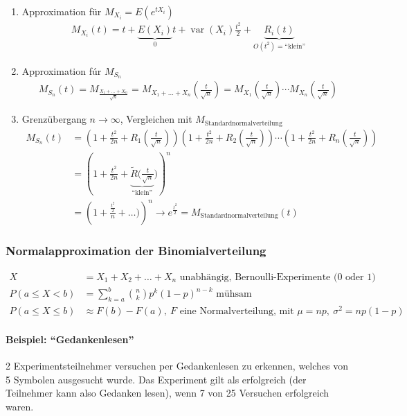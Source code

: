 \documentclass[10pt,a4paper]{scrartcl}
\newif\ifincludeExamples
\DeclareMathOperator{\var}{var}
\begin{document}
\begin{enumerate}
\item Approximation für $M_{X_i} = E(e^{tX_i})$
\begin{align*}
    M_{X_i}(t) = t + \underbrace{E(X_i)}_{0}t + \var(X_i)\frac{t^2}{2} + \underbrace{R_i(t)}_{O(t^2) = \text{``klein''}}
\end{align*}
\item Approximation fúr $M_{S_n}$
\begin{align*}
    M_{S_n}(t) = M_{\frac{X_1 + \dots + X_n}{\sqrt{n}}} = M_{X_1 + \dots + X_n} (\frac{t}{\sqrt{n}}) = M_{X_1}(\frac{t}{\sqrt{n}})\cdots M_{X_n}(\frac{t}{\sqrt{n}})
\end{align*}
\item Grenzübergang $n\to\infty$, Vergleichen mit $M_{\text{Standardnormalverteilung}}$
\begin{align*}
    M_{S_n}(t) &= \left( 1+\frac{t^2}{2n} + R_1(\frac{t}{\sqrt{n}})\right) \left( 1+\frac{t^2}{2n} + R_2(\frac{t}{\sqrt{n}})\right) \cdots 
        \left( 1+\frac{t^2}{2n} + R_n(\frac{t}{\sqrt{n}})\right) \\
        &= \left( 1+\frac{t^2}{2n} + \underbrace{\tilde{R}(\frac{t}{\sqrt{n}}}_{\text{``klein''}})\right)^n \\
        &= \left( 1+\frac{\frac{t^2}{2}}{n} + \dots)\right)^n \longrightarrow e^{\frac{t^2}{2}} = M_{\text{Standardnormalverteilung}}(t)
\end{align*}
\end{enumerate} 

\fi

\subsubsection{Normalapproximation der Binomialverteilung}
\begin{align*}
    X &= X_1 + X_2 + \dots + X_n \text{ unabhängig, Bernoulli-Experimente (0 oder 1)} \\
    P(a\le X <b) &= \sum_{k=a}^b \binom{n}{k} p^k(1-p)^{n-k} \text{ mühsam} \\
    P(a\le X \le b) &\approx F(b) - F(a),\  F \text{ eine Normalverteilung, mit } \mu = np,\ \sigma^2 = np(1-p)     
\end{align*}

\ifincludeExamples
\paragraph{Beispiel: ``Gedankenlesen''}
2 Experimentsteilnehmer versuchen per Gedankenlesen zu erkennen, welches von 5 Symbolen ausgesucht wurde. Das Experiment gilt als erfolgreich (der Teilnehmer kann also Gedanken lesen), wenn 7 von 25 Versuchen erfolgreich waren.
\end{document}

